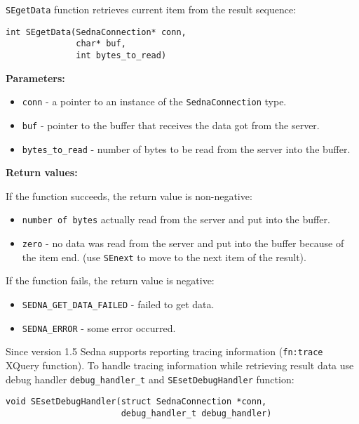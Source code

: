 \documentclass[a4paper,12pt]{article}
\newenvironment{citemize}
{\begin{itemize}
  \setlength{\itemsep}{0pt}
  \setlength{\parskip}{0pt}
  \setlength{\parsep}{0pt}}
{\end{itemize}}
\begin{document}
\verb!SEgetData! function retrieves current item from the result sequence:

\begin{verbatim}
int SEgetData(SednaConnection* conn,
              char* buf,
              int bytes_to_read)
\end{verbatim}

\noindent
\textbf{Parameters:}

\begin{citemize}
\item\verb!conn! - a pointer to an instance of the \verb!SednaConnection! type.
\item\verb!buf! - pointer to the buffer that receives the data got from the
server.
\item\verb!bytes_to_read! - number of bytes to be read from the server into the
buffer.
\end{citemize}

\noindent
\textbf{Return values:}

\medskip

\noindent
If the function succeeds, the return value is non-negative:

\begin{citemize}
\item\verb!number of bytes! actually read from the server and put into the
buffer.
\item\verb!zero! - no data was read from the server and put into the buffer
because of the item end. (use \verb!SEnext! to move to the next item of the
result).
\end{citemize}

\noindent
If the function fails, the return value is negative:

\begin{citemize}
\item\verb!SEDNA_GET_DATA_FAILED! - failed to get data.
\item\verb!SEDNA_ERROR! - some error occurred.
\end{citemize}

Since version 1.5 Sedna supports reporting tracing information (\verb!fn:trace!
XQuery function). To handle tracing information while retrieving result data use
debug handler \verb!debug_handler_t! and \verb!SEsetDebugHandler! function:

\begin{verbatim}
void SEsetDebugHandler(struct SednaConnection *conn,
                       debug_handler_t debug_handler)
\end{verbatim}
\end{document}
